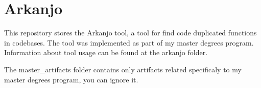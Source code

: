 \chapter{Arkanjo}
\hypertarget{index}{}\label{index}
\label{index_md_README}%
%


This repository stores the Arkanjo tool, a tool for find code duplicated functions in codebases. The tool was implemented as part of my master degree\textquotesingle{}s program. Information about tool usage can be found at the arkanjo folder.

The master\+\_\+artifacts folder contains only artifacts related specificaly to my master degree\textquotesingle{}s program, you can ignore it. 